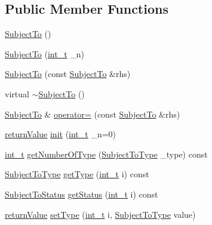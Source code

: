 \subsection*{Public Member Functions}
\begin{DoxyCompactItemize}
\item 
\hyperlink{class_subject_to_aee0471b99a2f3b87be4c0b5a8f756752}{Subject\+To} ()
\item 
\hyperlink{class_subject_to_adf9f182009ba07ea17dc20bd91e74b16}{Subject\+To} (\hyperlink{_types_8hpp_ab6fd6105e64ed14a0c9281326f05e623}{int\+\_\+t} \+\_\+n)
\item 
\hyperlink{class_subject_to_a83bcd729588d53c53dd57505879681eb}{Subject\+To} (const \hyperlink{class_subject_to}{Subject\+To} \&rhs)
\item 
virtual \hyperlink{class_subject_to_aac46ec3e5c1503400e96952afbb004a1}{$\sim$\+Subject\+To} ()
\item 
\hyperlink{class_subject_to}{Subject\+To} \& \hyperlink{class_subject_to_a9dbd9042783ca87abf3404416e295d7e}{operator=} (const \hyperlink{class_subject_to}{Subject\+To} \&rhs)
\item 
\hyperlink{_message_handling_8hpp_a81d556f613bfbabd0b1f9488c0fa865e}{return\+Value} \hyperlink{class_subject_to_accb449a868cc9945b57bec00b40eea17}{init} (\hyperlink{_types_8hpp_ab6fd6105e64ed14a0c9281326f05e623}{int\+\_\+t} \+\_\+n=0)
\item 
\hyperlink{_types_8hpp_ab6fd6105e64ed14a0c9281326f05e623}{int\+\_\+t} \hyperlink{class_subject_to_a1db9591577b6a9fd403086b832cc4d2a}{get\+Number\+Of\+Type} (\hyperlink{_types_8hpp_a3e65c061dde41562d1aeb2c4453bf1d3}{Subject\+To\+Type} \+\_\+type) const
\item 
\hyperlink{_types_8hpp_a3e65c061dde41562d1aeb2c4453bf1d3}{Subject\+To\+Type} \hyperlink{class_subject_to_a3c09533da89630a79752bf61bedd3583}{get\+Type} (\hyperlink{_types_8hpp_ab6fd6105e64ed14a0c9281326f05e623}{int\+\_\+t} i) const
\item 
\hyperlink{_types_8hpp_a70a6a40d261a015ead8d43aa589383a4}{Subject\+To\+Status} \hyperlink{class_subject_to_aecff1b8db622e9d1a4412bf9f0643ec3}{get\+Status} (\hyperlink{_types_8hpp_ab6fd6105e64ed14a0c9281326f05e623}{int\+\_\+t} i) const
\item 
\hyperlink{_message_handling_8hpp_a81d556f613bfbabd0b1f9488c0fa865e}{return\+Value} \hyperlink{class_subject_to_ab3bb754bbafdaaf99720b6a462d0ca4c}{set\+Type} (\hyperlink{_types_8hpp_ab6fd6105e64ed14a0c9281326f05e623}{int\+\_\+t} i, \hyperlink{_types_8hpp_a3e65c061dde41562d1aeb2c4453bf1d3}{Subject\+To\+Type} value)

\end{DoxyCompactItemize}
